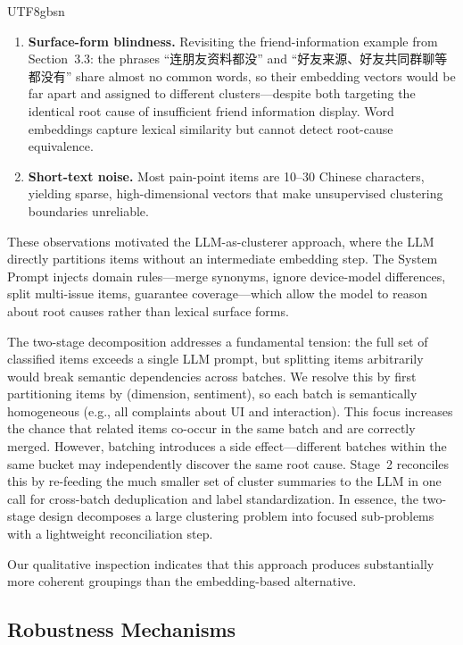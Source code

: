 \documentclass[11pt,a4paper]{article}
\begin{document}
\begin{CJK*}{UTF8}{gbsn}
\begin{enumerate}[nosep]
  \item \textbf{Surface-form blindness.} Revisiting the friend-information example from Section~3.3: the phrases ``连朋友资料都没'' and ``好友来源、好友共同群聊等都没有'' share almost no common words, so their embedding vectors would be far apart and assigned to different clusters---despite both targeting the identical root cause of insufficient friend information display. Word embeddings capture lexical similarity but cannot detect root-cause equivalence.
  \item \textbf{Short-text noise.} Most pain-point items are 10--30 Chinese characters, yielding sparse, high-dimensional vectors that make unsupervised clustering boundaries unreliable.
\end{enumerate}

These observations motivated the LLM-as-clusterer approach, where the LLM directly partitions items without an intermediate embedding step. The System Prompt injects domain rules---merge synonyms, ignore device-model differences, split multi-issue items, guarantee coverage---which allow the model to reason about root causes rather than lexical surface forms.

The two-stage decomposition addresses a fundamental tension: the full set of classified items exceeds a single LLM prompt, but splitting items arbitrarily would break semantic dependencies across batches. We resolve this by first partitioning items by (dimension, sentiment), so each batch is semantically homogeneous (e.g., all complaints about UI and interaction). This focus increases the chance that related items co-occur in the same batch and are correctly merged. However, batching introduces a side effect---different batches within the same bucket may independently discover the same root cause. Stage~2 reconciles this by re-feeding the much smaller set of cluster summaries to the LLM in one call for cross-batch deduplication and label standardization. In essence, the two-stage design decomposes a large clustering problem into focused sub-problems with a lightweight reconciliation step.

Our qualitative inspection indicates that this approach produces substantially more coherent groupings than the embedding-based alternative.

\subsection{Robustness Mechanisms}


\end{CJK*}
\end{document}
